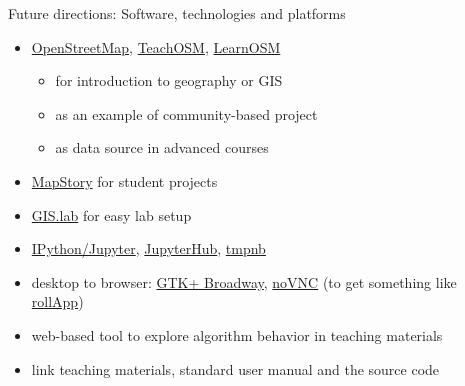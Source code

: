 \documentclass[xcolor={dvipsnames,usenames},beamer,aspectratio=169]{beamer}
\begin{document}
\begin{frame}{Future directions: Software, technologies and platforms}

\begin{itemize}
 \item \href{http://openstreetmap.org/}{OpenStreetMap},
    \href{http://teachosm.org}{TeachOSM}, \href{http://learnosm.org}{LearnOSM}
 \begin{itemize}
  \item for introduction to geography or GIS
  \item as an example of community-based project
  \item as data source in advanced courses
 \end{itemize}
 \item \href{http://mapstory.org/}{MapStory} {\scriptsize for student projects}
 \item \href{http://imincik.github.io/gis-lab/}{GIS.lab} {\scriptsize for easy lab setup}
 \item \href{http://jupyter.org/}{IPython/Jupyter},
    \href{https://github.com/jupyter/jupyterhub}{JupyterHub},
    \href{https://github.com/jupyter/tmpnb}{tmpnb}
 \item
    desktop to browser:
    \href{https://developer.gnome.org/gtk3/stable/gtk-broadway.html}{GTK+ Broadway},
    \href{https://kanaka.github.io/noVNC/}{noVNC}
    {\tiny (to get something like \href{https://www.rollapp.com/}{rollApp})}
 \item web-based tool to explore algorithm behavior in teaching materials
 \item link teaching materials, standard user manual and the source code
\end{itemize}

\end{frame}
\end{document}

